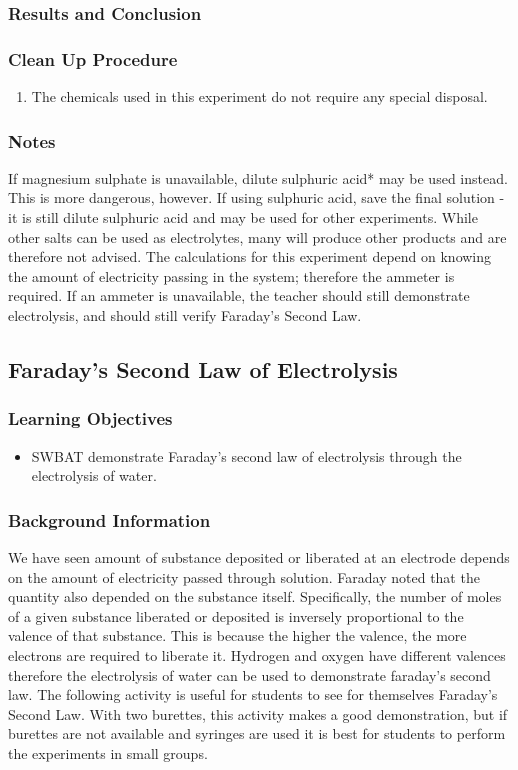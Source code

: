 \subsubsection*{Results and Conclusion}

\subsubsection*{Clean Up Procedure}
\begin{enumerate}
\item{The chemicals used in this experiment do not require any special disposal.}
\end{enumerate}

\subsubsection*{Notes}
If magnesium sulphate is unavailable, dilute sulphuric acid* may be used instead. This is more dangerous, however. If using sulphuric acid, save the final solution - it is still dilute sulphuric acid and may be used for other experiments. While other salts can be used as electrolytes, many will produce other products and are therefore not advised. The calculations for this experiment depend on knowing the amount of electricity passing in the system; therefore the ammeter is required. If an ammeter is unavailable, the teacher should still demonstrate electrolysis, and should still verify Faraday's Second Law.

\subsection{Faraday's Second Law of Electrolysis}

\subsubsection*{Learning Objectives}
\begin{itemize}
\item{SWBAT demonstrate Faraday's second law of electrolysis through the electrolysis of water.}
\end{itemize}

\subsubsection*{Background Information}
We have seen amount of substance deposited or liberated at an electrode depends on the amount of electricity passed through solution. Faraday noted that the quantity also depended on the substance itself. Specifically, the number of moles of a given substance liberated or deposited is inversely proportional to the valence of that substance. This is because the higher the valence, the more electrons are required to liberate it. Hydrogen and oxygen have different valences therefore the electrolysis of water can be used to demonstrate faraday's second law. 
The following activity is useful for students to see for themselves Faraday's Second Law. With two burettes, this activity makes a good demonstration, but if burettes are not available and syringes are used it is best for students to perform the experiments in small groups.

